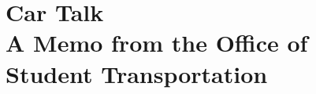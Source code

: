 

\def\thetitle{Car Talk\\A Memo from the Office of Student Transportation}
\def\shorttitle{Car Talk}
\def\theauthors{\textit{Parting Thots} by Geoffrey Challen}
\def\shortauthors{Challen}


\pagestyle{document}
\thispagestyle{emptydocument}
\chapter{\thetitle}


